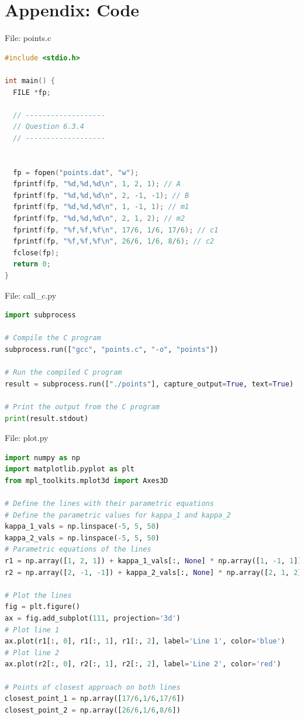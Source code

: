\documentclass{beamer}
\numberwithin{equation}{section}
\theoremstyle{remark}
\begin{document}
\section*{Appendix: Code}

\begin{frame}[fragile]{File: points.c}
\begin{lstlisting}[language=C]
#include <stdio.h>

int main() {
  FILE *fp;

  // -------------------
  // Question 6.3.4
  // -------------------


  fp = fopen("points.dat", "w");
  fprintf(fp, "%d,%d,%d\n", 1, 2, 1); // A
  fprintf(fp, "%d,%d,%d\n", 2, -1, -1); // B
  fprintf(fp, "%d,%d,%d\n", 1, -1, 1); // m1
  fprintf(fp, "%d,%d,%d\n", 2, 1, 2); // m2
  fprintf(fp, "%f,%f,%f\n", 17/6, 1/6, 17/6); // c1
  fprintf(fp, "%f,%f,%f\n", 26/6, 1/6, 8/6); // c2
  fclose(fp);
  return 0;
}
\end{lstlisting}
\end{frame}

\begin{frame}[fragile]{File: call\_c.py}
\begin{lstlisting}[language=Python]
import subprocess

# Compile the C program
subprocess.run(["gcc", "points.c", "-o", "points"])

# Run the compiled C program
result = subprocess.run(["./points"], capture_output=True, text=True)

# Print the output from the C program
print(result.stdout)
\end{lstlisting}
\end{frame}

\begin{frame}[fragile]{File: plot.py}
\begin{lstlisting}[language=Python]
import numpy as np
import matplotlib.pyplot as plt
from mpl_toolkits.mplot3d import Axes3D

# Define the lines with their parametric equations
# Define the parametric values for kappa_1 and kappa_2
kappa_1_vals = np.linspace(-5, 5, 50)
kappa_2_vals = np.linspace(-5, 5, 50)
# Parametric equations of the lines
r1 = np.array([1, 2, 1]) + kappa_1_vals[:, None] * np.array([1, -1, 1])
r2 = np.array([2, -1, -1]) + kappa_2_vals[:, None] * np.array([2, 1, 2])

# Plot the lines
fig = plt.figure()
ax = fig.add_subplot(111, projection='3d')
# Plot line 1
ax.plot(r1[:, 0], r1[:, 1], r1[:, 2], label='Line 1', color='blue')
# Plot line 2
ax.plot(r2[:, 0], r2[:, 1], r2[:, 2], label='Line 2', color='red')

# Points of closest approach on both lines
closest_point_1 = np.array([17/6,1/6,17/6])
closest_point_2 = np.array([26/6,1/6,8/6])
\end{lstlisting}
\end{frame}
\end{document}

